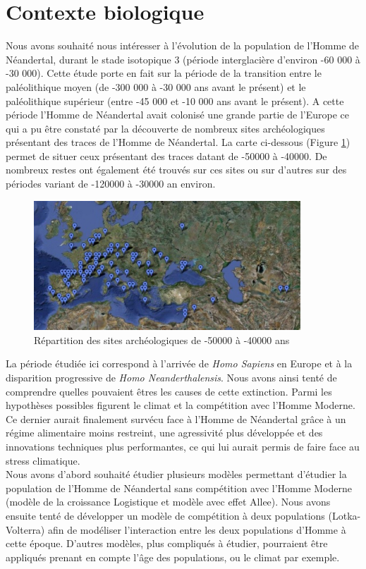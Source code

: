 \documentclass[a4paper,11pt]{article}
\begin{document}
\section{Contexte biologique}
	Nous avons souhaité nous intéresser à l'évolution de la population de l'Homme de Néandertal, durant le stade isotopique 3 (période interglacière d'environ -60 000 à -30 000). Cette étude porte en fait sur la période de la transition entre le paléolithique moyen (de -300 000 à -30 000 ans avant le présent) et  le paléolithique supérieur (entre -45 000 et -10 000 ans avant le présent). A cette période l'Homme de Néandertal avait colonisé une grande partie de l'Europe ce qui a pu être constaté par la découverte de nombreux sites archéologiques présentant des traces de l'Homme de Néandertal. La carte ci-dessous (Figure \ref{C1}) permet de situer ceux présentant des traces datant de -50000 à -40000. De nombreux restes ont également été trouvés sur ces sites ou sur d'autres sur des périodes variant de -120000 à -30000 an environ.\\ 
\begin{figure}[H]
	\centering
    \includegraphics[width=10cm]{SiteArche.jpg}
    \caption{Répartition des sites archéologiques de -50000 à -40000 ans}
    \label{C1}
\end{figure}
La période étudiée ici correspond à l'arrivée de \textit{Homo Sapiens} en Europe et à la disparition progressive de \textit{Homo Neanderthalensis}. Nous avons ainsi tenté de comprendre quelles pouvaient êtres les causes de cette extinction. Parmi les hypothèses possibles figurent le climat et la compétition avec l'Homme Moderne. Ce dernier aurait finalement survécu face à l'Homme de Néandertal grâce à un régime alimentaire moins restreint, une agressivité plus développée et des innovations techniques plus performantes, ce qui lui aurait permis de faire face au stress climatique.\\
Nous avons d'abord souhaité étudier plusieurs modèles permettant d'étudier la population de  l'Homme de Néandertal sans compétition avec l'Homme Moderne (modèle de la croissance Logistique et modèle avec effet Allee). Nous avons ensuite tenté de développer un modèle de compétition à deux populations (Lotka-Volterra) afin de modéliser l'interaction entre les deux populations d'Homme à cette époque. D'autres modèles, plus compliqués à étudier, pourraient être appliqués prenant en compte l'âge des populations, ou le  climat par exemple.
\end{document}
